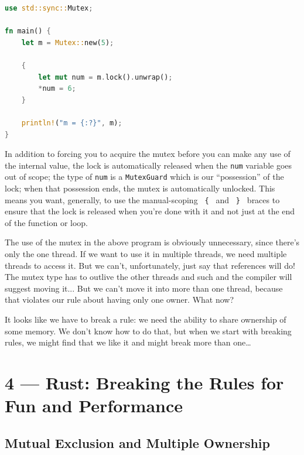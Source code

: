\documentclass[a4paper]{report}
\begin{document}
\begin{lstlisting}[language=Rust]
use std::sync::Mutex;

fn main() {
    let m = Mutex::new(5);

    {
        let mut num = m.lock().unwrap();
        *num = 6;
    }

    println!("m = {:?}", m);
}
\end{lstlisting}

In addition to forcing you to acquire the mutex before you can make any use of the internal value, the lock is automatically released when the \texttt{num} variable goes out of scope; the type of \texttt{num} is a \texttt{MutexGuard} which is our ``possession'' of the lock; when that possession ends, the mutex is automatically unlocked. This means you want, generally, to use the manual-scoping \texttt{ \{ } and \texttt{ \} } braces to ensure that the lock is released when you're done with it and not just at the end of the function or loop.

The use of the mutex in the above program is obviously unnecessary, since there's only the one thread. If we want to use it in multiple threads, we need multiple threads to access it. But we can't, unfortunately, just say that references will do! The mutex type has to outlive the other threads and such and the compiler will suggest moving it... But we can't move it into more than one thread, because that violates our rule about having only one owner. What now?

It looks like we have to break a rule: we need the ability to share ownership of some memory. We don't know how to do that, but when we start with breaking rules, we might find that we like it and might break more than one\ldots










\chapter*{4 --- Rust: Breaking the Rules for Fun and Performance}


\section*{Mutual Exclusion and Multiple Ownership}
\end{document}
